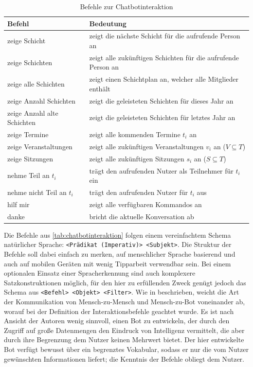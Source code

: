 \begin{table}[H]
\centering
\begin{tabular}{l|l}
  \textbf{Befehl }& \textbf{Bedeutung }\\
 \hline
 zeige Schicht & zeigt die nächste Schicht für die aufrufende Person an \\
 zeige Schichten & zeigt alle zukünftigen Schichten für die aufrufende Person an \\
 zeige alle Schichten & zeigt einen Schichtplan an, welcher alle Mitglieder enthält \\
 
 zeige Anzahl Schichten & zeigt die geleisteten Schichten für dieses Jahr an \\
 zeige Anzahl alte Schichten & zeigt die geleisteten Schichten für letztes Jahr an \\
 
 zeige Termine & zeigt alle kommenden Termine $t_i$ an \\
 zeige Veranstaltungen & zeigt alle zukünftigen Veranstaltungen $v_i$ an ($V \subseteq T$) \\
 zeige Sitzungen & zeigt alle zukünftigen Sitzungen $s_i$ an ($S \subseteq T$) \\
 
 nehme Teil an $t_i$ & trägt den aufrufenden Nutzer als Teilnehmer für $t_i$ ein \\
 nehme nicht Teil an $t_i$ & trägt den aufrufenden Nutzer für $t_i$ aus\\

 hilf mir & zeigt alle verfügbaren Kommandos an \\
 danke & bricht die aktuelle Konversation ab \\
\end{tabular}
\caption{Befehle zur Chatbotinteraktion}
\label{tab:chatbotinteraktion}
\end{table}


Die Befehle aus \autoref{tab:chatbotinteraktion} folgen einem vereinfachtem Schema natürlicher Sprache: \texttt{<Prädikat (Imperativ)> <Subjekt>}. Die Struktur der Befehle soll dabei einfach zu merken, auf menschlicher Sprache basierend und auch auf mobilen Geräten mit wenig Tipparbeit verwendbar sein. Bei einem optionalen Einsatz einer Spracherkennung sind auch komplexere Satzkonstruktionen möglich, für den hier zu erfüllenden Zweck genügt jedoch das Schema aus \texttt{<Befehl> <Objekt> <Filter>}. Wie in \cite{ZueConversationalinterfacesadvances2000} beschrieben, weicht die Art der Kommunikation von Mensch-zu-Mensch und Mensch-zu-Bot voneinander ab, worauf bei der Definition der Interaktionsbefehle geachtet wurde. Es ist nach Ansicht der Autoren wenig sinnvoll, einen Bot zu entwickeln, der durch den Zugriff auf große Datenmengen den Eindruck von Intelligenz vermittelt, die aber durch ihre Begrenzung dem Nutzer keinen Mehrwert bietet. Der hier entwickelte Bot verfügt bewusst über ein begrenztes Vokabular, sodass er nur die vom Nutzer gewünschten Informationen liefert; die Kenntnis der Befehle obliegt dem Nutzer.

